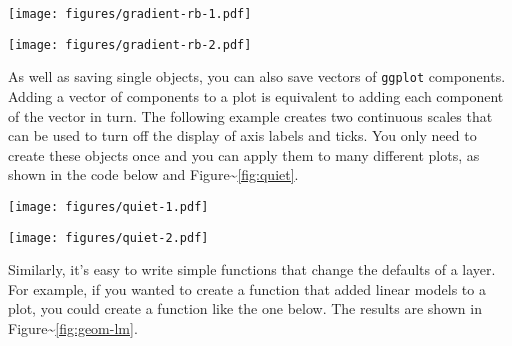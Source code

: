 \texttt{[image: figures/gradient-rb-1.pdf]}

\begin{Shaded}
\begin{Highlighting}[]
  \NormalTok{) +}
\StringTok{  }
\end{Highlighting}
\end{Shaded}

\texttt{[image: figures/gradient-rb-2.pdf]}

As well as saving single objects, you can also save vectors of
\texttt{ggplot} components. Adding a vector of components to a plot is
equivalent to adding each component of the vector in turn. The following
example creates two continuous scales that can be used to turn off the
display of axis labels and ticks. You only need to create these objects
once and you can apply them to many different plots, as shown in the
code below and Figure\textasciitilde{}\ref{fig:quiet}.

\begin{Shaded}
\begin{Highlighting}[]
\StringTok{ }\NormalTok{(} \NormalTok{)}
\StringTok{ }\NormalTok{(} \NormalTok{)}

 \StringTok{ }
\end{Highlighting}
\end{Shaded}

\texttt{[image: figures/quiet-1.pdf]}

\begin{Shaded}
\begin{Highlighting}[]
 \StringTok{ }\StringTok{ }
\end{Highlighting}
\end{Shaded}

\texttt{[image: figures/quiet-2.pdf]}

Similarly, it's easy to write simple functions that change the defaults
of a layer. For example, if you wanted to create a function that added
linear models to a plot, you could create a function like the one below.
The results are shown in Figure\textasciitilde{}\ref{fig:geom-lm}.

